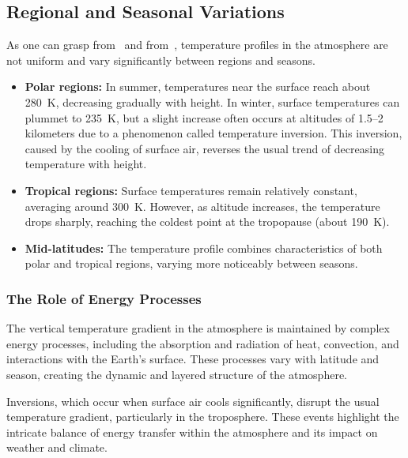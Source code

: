 \subsection{Regional and Seasonal Variations}

As one can grasp from~\fig{\ref{fig:temp-profile-dobson}} and from~\tabref{\ref{tab:atm-temps-layer-latitude}}, temperature profiles in the atmosphere are not uniform and vary significantly between regions and seasons.

\begin{itemize}
	\item \textbf{Polar regions:} In summer, temperatures near the surface reach about 280~K, decreasing gradually with height. In winter, surface temperatures can plummet to 235~K, but a slight increase often occurs at altitudes of 1.5--2 kilometers due to a phenomenon called temperature inversion. This inversion, caused by the cooling of surface air, reverses the usual trend of decreasing temperature with height.
	\item \textbf{Tropical regions:} Surface temperatures remain relatively constant, averaging around 300~K. However, as altitude increases, the temperature drops sharply, reaching the coldest point at the tropopause (about 190~K).
	\item \textbf{Mid-latitudes:} The temperature profile combines characteristics of both polar and tropical regions, varying more noticeably between seasons.
\end{itemize}


\subsubsection*{The Role of Energy Processes}

The vertical temperature gradient in the atmosphere is maintained by complex energy processes, including the absorption and radiation of heat, convection, and interactions with the Earth's surface. These processes vary with latitude and season, creating the dynamic and layered structure of the atmosphere.

Inversions, which occur when surface air cools significantly, disrupt the usual temperature gradient, particularly in the troposphere. These events highlight the intricate balance of energy transfer within the atmosphere and its impact on weather and climate.

